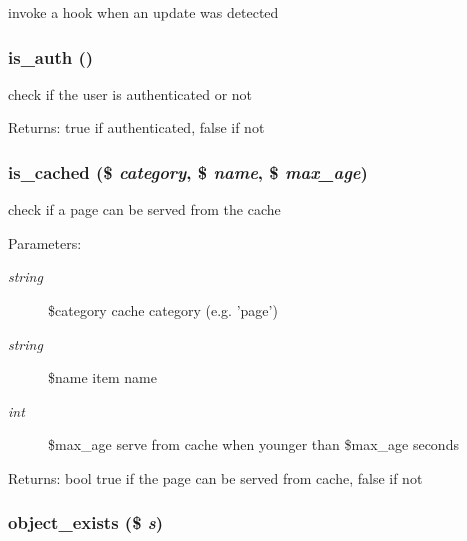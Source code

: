 invoke a hook when an update was detected \hypertarget{common_8inc_8php_b3abbb2cd13e01231533e7cdc93da6db}{
\subsubsection[{is\_\-auth}]{\setlength{\rightskip}{0pt plus 5cm}is\_\-auth ()}}
\label{common_8inc_8php_b3abbb2cd13e01231533e7cdc93da6db}


check if the user is authenticated or not

\begin{Desc}
\item[Returns:]true if authenticated, false if not \end{Desc}
\hypertarget{common_8inc_8php_6fb34b9210b43349ca3eb16b2738a28b}{
\subsubsection[{is\_\-cached}]{\setlength{\rightskip}{0pt plus 5cm}is\_\-cached (\$ {\em category}, \/  \$ {\em name}, \/  \$ {\em max\_\-age})}}
\label{common_8inc_8php_6fb34b9210b43349ca3eb16b2738a28b}


check if a page can be served from the cache

\begin{Desc}
\item[Parameters:]
\begin{description}
\item[{\em string}]\$category cache category (e.g. 'page') \item[{\em string}]\$name item name \item[{\em int}]\$max\_\-age serve from cache when younger than \$max\_\-age seconds \end{description}
\end{Desc}
\begin{Desc}
\item[Returns:]bool true if the page can be served from cache, false if not \end{Desc}
\hypertarget{common_8inc_8php_3d71a269e01b98748fb57719feef27be}{
\subsubsection[{object\_\-exists}]{\setlength{\rightskip}{0pt plus 5cm}object\_\-exists (\$ {\em s})}}
\label{common_8inc_8php_3d71a269e01b98748fb57719feef27be}


